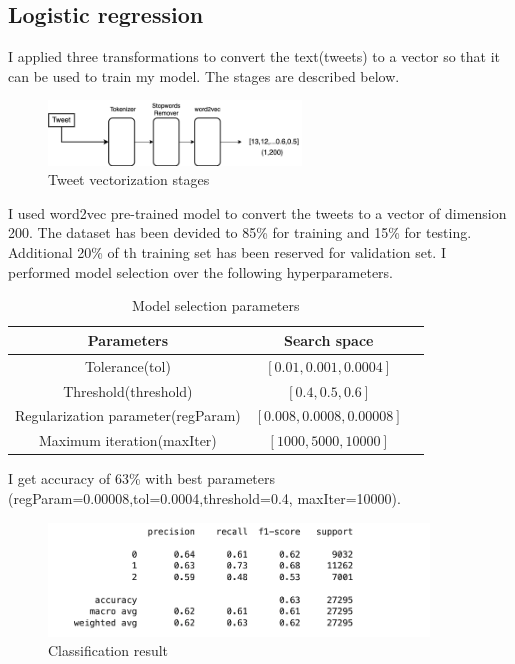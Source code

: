 \documentclass[12pt,a4paper]{report}
\begin{document}
\subsection{Logistic regression}
I applied three transformations to convert the text(tweets) to a vector so that it can be used to train my model. The stages are described below.
\begin{figure}[H]
    \centering
    \includegraphics[width=0.6\textwidth]{images/LR.drawio.png}
    \caption{Tweet vectorization stages}
    \label{fig:confusion-svm}
\end{figure}

I used word2vec pre-trained model to convert the tweets to a vector of dimension 200. The dataset has been devided to 85\% for training and 15\% for testing. Additional 20\% of th training set has been reserved for  validation set. I performed model selection over the following hyperparameters.

\begin{table}[h]
\centering
    \begin{tabular}{c c c}
        Parameters & Search space \\
        \midrule
        Tolerance(tol) & $ [0.01, 0.001, 0.0004]$ \\
        Threshold(threshold) & $ [0.4,0.5,0.6]$ \\
        Regularization parameter(regParam) & $ [0.008,0.0008,0.00008]$ \\
        Maximum iteration(maxIter) & $ [1000,5000,10000]$ \\
        \bottomrule
    \end{tabular}
    \caption{Model selection parameters}
    \label{tab:hyperparameter}
\end{table}
I get accuracy of 63\% with best parameters (regParam=0.00008,tol=0.0004,threshold=0.4, maxIter=10000).

\begin{figure}[H]
    \centering
\includegraphics[width=0.9\textwidth]{images/lr.png}
    \caption{Classification result}
    \label{fig:confusion-svm}
\end{figure}
\end{document}
